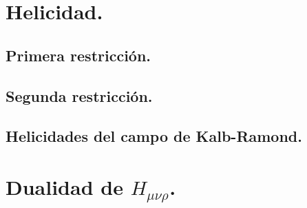 \vspace{4mm}
\section{Helicidad.} \label{KRmassless:Helicidad}

\vspace{4mm}
\subsection{Primera restricción.}


\vspace{4mm}
\subsection{Segunda restricción.}

\vspace{4mm}
\subsection{Helicidades del campo de Kalb-Ramond.}

\vspace{4mm}
\section{Dualidad de $H_{\mu\nu\rho}$.} \label{KRMassless:Dual}
